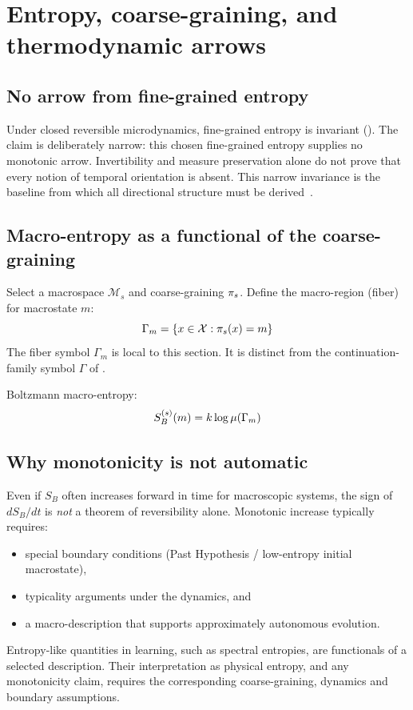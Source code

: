 \section{Entropy, coarse-graining, and thermodynamic arrows}\label{sec:entropy-arrows}

\subsection{No arrow from fine-grained entropy}

Under closed reversible microdynamics, fine-grained entropy is invariant
().  The claim is deliberately narrow: this
chosen fine-grained entropy supplies no monotonic arrow.  Invertibility
and measure preservation alone do not prove that every notion of
temporal orientation is absent.  This narrow invariance is the baseline
from which all directional structure must be
derived~\cite{lebowitz1993boltzmann}.

\subsection{Macro-entropy as a functional of the coarse-graining}

Select a macrospace $\mathcal{M}_s$ and coarse-graining $\pi_s$.  Define
the macro-region (fiber) for macrostate $m$:
\begin{equation}
  \Gamma_m = \{ x \in \mathcal{X} : \pi_s(x) = m \}\label{eq:macro-region}
\end{equation}
The fiber symbol $\Gamma_m$ is local to this section.  It is distinct from
the continuation-family symbol $\Gamma$ of .

Boltzmann macro-entropy:
\begin{equation}
  S_B^{(s)}(m) = k \log \mu(\Gamma_m)\label{eq:boltzmann-entropy}
\end{equation}

\subsection{Why monotonicity is not automatic}

Even if $S_B$ often increases forward in time for macroscopic systems, the sign
of $dS_B/dt$ is \emph{not} a theorem of reversibility alone.  Monotonic increase
typically requires:
\begin{itemize}
  \item special boundary conditions (Past Hypothesis / low-entropy initial
        macrostate),
  \item typicality arguments under the dynamics, and
  \item a macro-description that supports approximately autonomous evolution.
\end{itemize}

Entropy-like quantities in learning, such as spectral entropies, are
functionals of a selected description. Their interpretation as physical
entropy, and any monotonicity claim, requires the corresponding
coarse-graining, dynamics and boundary assumptions.
